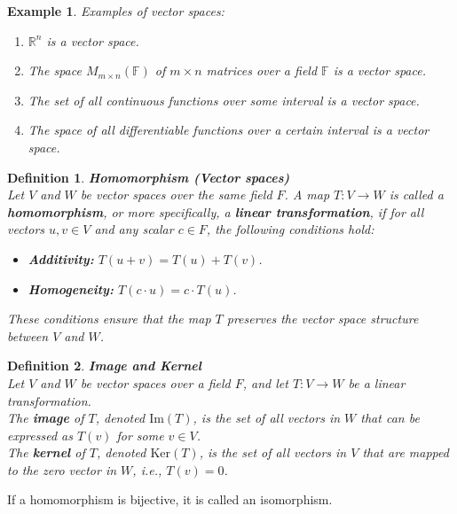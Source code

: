 \documentclass[11pt]{book} %
\newtheorem{definition}{Definition}[section]
\newtheorem*{example*}{Example}
\begin{document}
\begin{example*}
Examples of vector spaces:
\begin{enumerate}
\item \( \mathbb{R}^n \) is a vector space.
\item The space \( M_{m \times n}(\mathbb{F}) \) of \( m \times n \) matrices over a field \(\mathbb{F}\) is a vector space.
\item The set of all continuous functions over some interval is a vector space.
\item The space of all differentiable functions over a certain interval is a vector space.
\end{enumerate}
\end{example*}

\begin{definition}{\textbf{Homomorphism (Vector spaces)}} \\
    Let \(V\) and \(W\) be vector spaces over the same field \(F\). A map \( T: V \to W \) is called a \textbf{homomorphism}, 
    or more specifically, a \textbf{linear transformation}, if for all vectors \(u, v \in V\) and any scalar \(c \in F\), the following conditions hold:
    \begin{itemize}
        \item \textbf{Additivity:} \( T(u + v) = T(u) + T(v) \).
        \item \textbf{Homogeneity:} \( T(c \cdot u) = c \cdot T(u) \).
    \end{itemize}
    These conditions ensure that the map \(T\) preserves the vector space structure between \(V\) and \(W\).
\end{definition}

\begin{definition}{\textbf{Image and Kernel}} \\
    Let \( V \) and \( W \) be vector spaces over a field \( F \), and let \( T: V \to W \) be a linear transformation.  \\
    The \textbf{image} of \( T \), denoted \( \text{Im}(T) \), is the set of all vectors in \( W \) that can be expressed as \( T(v) \) for some \( v \in V \). \\
    The \textbf{kernel} of \( T \), denoted \( \text{Ker}(T) \), is the set of all vectors in \( V \) that are mapped to the zero vector in \( W \), i.e., \( T(v) = 0 \).
\end{definition}


If a homomorphism is bijective, it is called an isomorphism.
\end{document}
